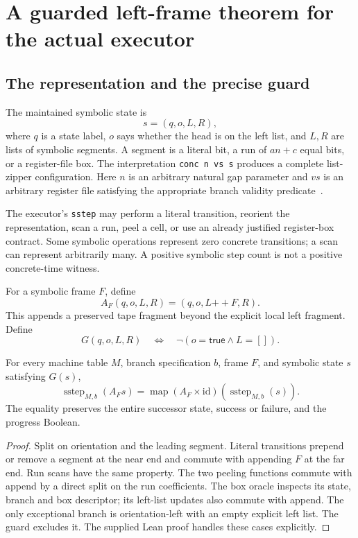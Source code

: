 \section{A guarded left-frame theorem for the actual executor}
\subsection{The representation and the precise guard}
The maintained symbolic state is
\[
 s=(q,o,L,R),
\]
where $q$ is a state label, $o$ says whether the head is on the left list, and $L,R$ are lists of symbolic segments. A segment is a literal bit, a run of $an+c$ equal bits, or a register-file box. The interpretation \texttt{conc n vs s} produces a complete list-zipper configuration. Here $n$ is an arbitrary natural gap parameter and $vs$ is an arbitrary register file satisfying the appropriate branch validity predicate~\cite{runtime}.

The executor's \texttt{sstep} may perform a literal transition, reorient the representation, scan a run, peel a cell, or use an already justified register-box contract. Some symbolic operations represent zero concrete transitions; a scan can represent arbitrarily many. A positive symbolic step count is not a positive concrete-time witness.

For a symbolic frame $F$, define
\[
 A_F(q,o,L,R)=(q,o,L\mathbin{+\!+}F,R).
\]
This appends a preserved tape fragment beyond the explicit local left fragment. Define
\[
 G(q,o,L,R)\quad\Longleftrightarrow\quad
 \neg(o=\mathsf{true}\land L=[]).
\]

\begin{theorem}\label{thm:frame}
For every machine table $M$, branch specification $b$, frame $F$, and symbolic state $s$ satisfying $G(s)$,
\[
 \operatorname{sstep}_{M,b}(A_Fs)
 =\operatorname{map}(A_F\times\mathrm{id})
       (\operatorname{sstep}_{M,b}(s)).
\]
The equality preserves the entire successor state, success or failure, and the progress Boolean.
\end{theorem}
\begin{proof}
Split on orientation and the leading segment. Literal transitions prepend or remove a segment at the near end and commute with appending $F$ at the far end. Run scans have the same property. The two peeling functions commute with append by a direct split on the run coefficients. The box oracle inspects its state, branch and box descriptor; its left-list updates also commute with append. The only exceptional branch is orientation-left with an empty explicit left list. The guard excludes it. The supplied Lean proof handles these cases explicitly.
\end{proof}

